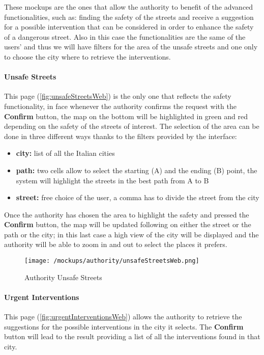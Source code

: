 				These mockups are the ones that allow the authority to benefit of the advanced functionalities, such as: finding the safety of the streets and receive a suggestion for a possible intervention that can be considered in order to enhance the safety of a dangerous street. Also in this case the functionalities are the same of the users' and thus we will have filters for the area of the unsafe streets and one only to choose the city where to retrieve the interventions.
				
				\paragraph{Unsafe Streets}
				This page (\autoref{fig:unsafeStreetsWeb}) is the only one that reflects the safety functionality, in face whenever the authority confirms the request with the \textbf{Confirm} button, the map on the bottom will be highlighted in green and red depending on the safety of the streets of interest. The selection of the area can be done in three different ways thanks to the filters provided by the interface:
				
				\begin{itemize}
					\item \textbf{city:} list of all the Italian cities
					\item \textbf{path:} two cells allow to select the starting (A) and the ending (B) point, the system will highlight the streets in the best path from A to B
					\item \textbf{street:} free choice of the user, a comma has to divide the street from the city
				\end{itemize}
				
				Once the authority has chosen the area to highlight the safety and pressed the \textbf{Confirm} button, the map will be updated following on either the street or the path or the city; in this last case a high view of the city will be displayed and the authority will be able to zoom in and out to select the places it prefers.
				
				\vspace{0.6cm}
					
				\begin{figure}[ht!]
					\centering
					\texttt{[image: /mockups/authority/unsafeStreetsWeb.png]}
					\caption{\label{fig:unsafeStreetsWeb} Authority Unsafe Streets}
				\end{figure}
			
				\paragraph{Urgent Interventions}
				This page (\autoref{fig:urgentInterventionsWeb}) allows the authority to retrieve the suggestions for the possible interventions in the city it selects. The \textbf{Confirm} button will lead to the result providing a list of all the interventions found in that city.\\
				
